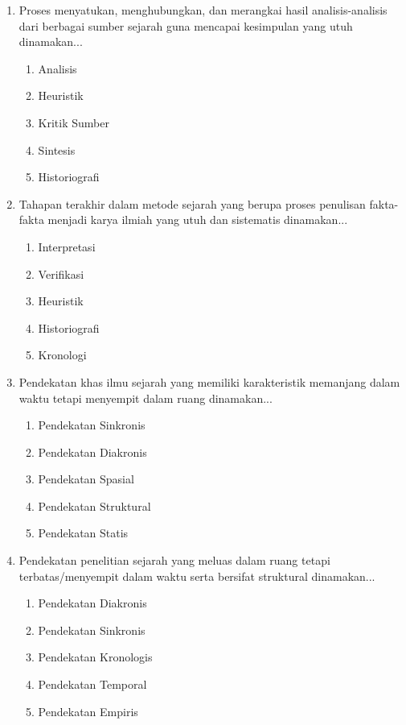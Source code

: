 \documentclass[12pt, a4paper]{article}
\begin{document}
\begin{enumerate}[label=\arabic*.]
    \item Proses menyatukan, menghubungkan, dan merangkai hasil analisis-analisis dari berbagai sumber sejarah guna mencapai kesimpulan yang utuh dinamakan...
    \begin{enumerate}[label=\Alph*.]
        \item Analisis
        \item Heuristik
        \item Kritik Sumber
        \item Sintesis
        \item Historiografi
    \end{enumerate}

    \item Tahapan terakhir dalam metode sejarah yang berupa proses penulisan fakta-fakta menjadi karya ilmiah yang utuh dan sistematis dinamakan...
    \begin{enumerate}[label=\Alph*.]
        \item Interpretasi
        \item Verifikasi
        \item Heuristik
        \item Historiografi
        \item Kronologi
    \end{enumerate}

    \item Pendekatan khas ilmu sejarah yang memiliki karakteristik memanjang dalam waktu tetapi menyempit dalam ruang dinamakan...
    \begin{enumerate}[label=\Alph*.]
        \item Pendekatan Sinkronis
        \item Pendekatan Diakronis
        \item Pendekatan Spasial
        \item Pendekatan Struktural
        \item Pendekatan Statis
    \end{enumerate}

    \item Pendekatan penelitian sejarah yang meluas dalam ruang tetapi terbatas/menyempit dalam waktu serta bersifat struktural dinamakan...
    \begin{enumerate}[label=\Alph*.]
        \item Pendekatan Diakronis
        \item Pendekatan Sinkronis
        \item Pendekatan Kronologis
        \item Pendekatan Temporal
        \item Pendekatan Empiris
    \end{enumerate}


\end{enumerate}
\end{document}
